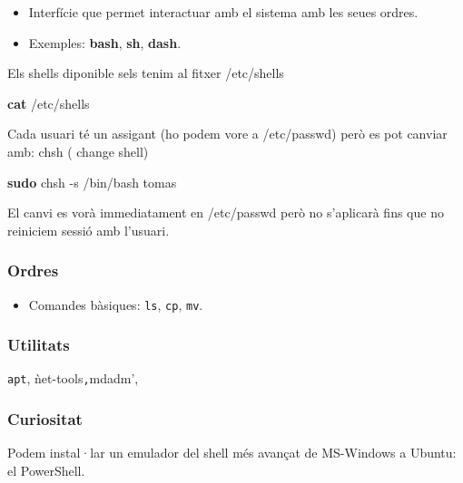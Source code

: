 \documentclass[
  a4paper,
]{article}
\newenvironment{Shaded}{\begin{snugshade}}{\end{snugshade}}
\newcommand{\AttributeTok}[1]{\textcolor[rgb]{0.13,0.29,0.53}{#1}}
\newcommand{\FunctionTok}[1]{\textcolor[rgb]{0.13,0.29,0.53}{\textbf{#1}}}
\newcommand{\NormalTok}[1]{#1}
\providecommand{\tightlist}{%
  \setlength{\itemsep}{0pt}\setlength{\parskip}{0pt}}
\begin{document}
\begin{itemize}
\tightlist
\item
  Interfície que permet interactuar amb el sistema amb les seues ordres.
\item
  Exemples: \textbf{bash}, \textbf{sh}, \textbf{dash}.
\end{itemize}

Els shells diponible sels tenim al fitxer /etc/shells

\begin{Shaded}
\begin{Highlighting}[]
\FunctionTok{cat}\NormalTok{ /etc/shells}
\end{Highlighting}
\end{Shaded}

Cada usuari té un assigant (ho podem vore a /etc/passwd) però es pot
canviar amb: chsh ( change shell)

\begin{Shaded}
\begin{Highlighting}[]
\FunctionTok{sudo}\NormalTok{ chsh }\AttributeTok{{-}s}\NormalTok{ /bin/bash tomas}
\end{Highlighting}
\end{Shaded}

El canvi es vorà immediatament en /etc/passwd però no s'aplicarà fins
que no reiniciem sessió amb l'usuari.

\subsubsection{Ordres}\label{ordres}

\begin{itemize}
\tightlist
\item
  Comandes bàsiques: \texttt{ls}, \texttt{cp}, \texttt{mv}.
\end{itemize}

\subsubsection{Utilitats}\label{utilitats}

\texttt{apt}, ǹet-tools\texttt{,}mdadm',

\subsubsection{Curiositat}\label{curiositat}

Podem instal·lar un emulador del shell més avançat de MS-Windows a
Ubuntu: el PowerShell.
\end{document}
